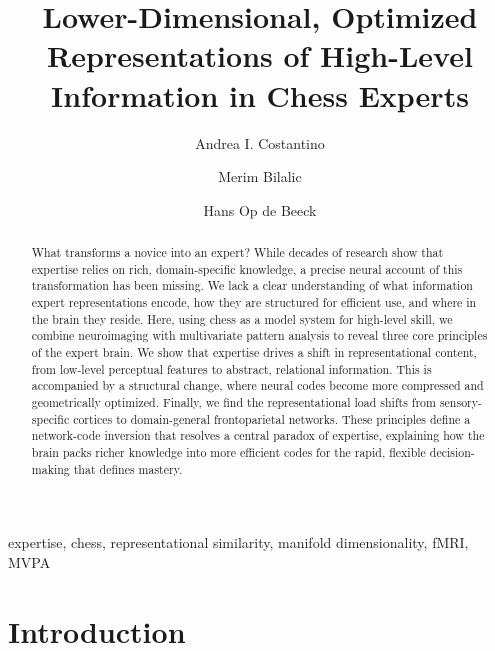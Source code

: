 \documentclass[preprint,12pt]{elsarticle}
\begin{document}
\begin{frontmatter}

\title{Lower-Dimensional, Optimized Representations of High-Level Information in Chess Experts}

\author[inst1]{Andrea I. Costantino}
\author[inst2]{Merim Bilalic}
\author[inst1]{Hans Op de Beeck}


\address[inst1]{Brain and Cognition, Faculty of Psychology and Educational Sciences, KU Leuven, Leuven, Belgium}
\address[inst2]{Department of Psychology, Northumbria University, Newcastle upon Tyne, UK}

\begin{abstract}
What transforms a novice into an expert? While decades of research show that expertise relies on rich, domain-specific knowledge, a precise neural account of this transformation has been missing. We lack a clear understanding of what information expert representations encode, how they are structured for efficient use, and where in the brain they reside. Here, using chess as a model system for high-level skill, we combine neuroimaging with multivariate pattern analysis to reveal three core principles of the expert brain. We show that expertise drives a shift in representational content, from low-level perceptual features to abstract, relational information. This is accompanied by a structural change, where neural codes become more compressed and geometrically optimized. Finally, we find the representational load shifts from sensory-specific cortices to domain-general frontoparietal networks. These principles define a network-code inversion that resolves a central paradox of expertise, explaining how the brain packs richer knowledge into more efficient codes for the rapid, flexible decision-making that defines mastery.
\end{abstract}

\begin{keyword}
expertise, chess, representational similarity, manifold dimensionality, fMRI, MVPA
\end{keyword}

\end{frontmatter}
\linenumbers

\newpage

\section{Introduction}  
\end{document}
